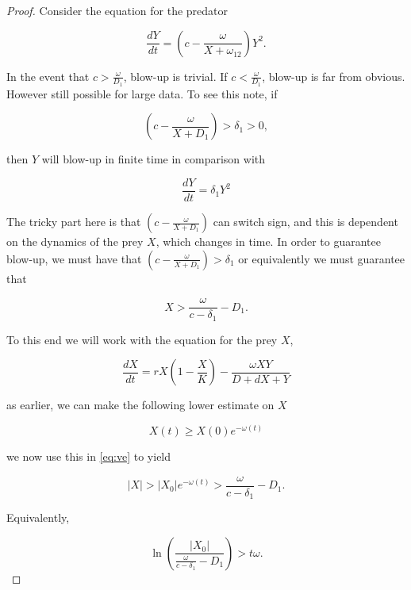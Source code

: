 \documentclass[10pt]{amsart}
\theoremstyle{definition}
\begin{document}
\begin{proof}
Consider the equation for the predator

\begin{equation*}
\frac{dY}{dt}=\left(c-\frac{\omega}{X+\omega_{12}}\right)Y^{2}.
\end{equation*}

In the event that $c> \frac{\omega}{D_{1}}$, blow-up is trivial. If $c < \frac{\omega}{D_{1}}$,  blow-up is far from obvious. However still possible for large data. To see this note, if

\begin{equation*}
\left(c-\frac{\omega}{X+D_{1}}\right) > \delta_{1} > 0,
\end{equation*}

then $Y$ will blow-up in finite time in comparison with

\begin{equation*}
\frac{dY}{dt}=\delta_{1} Y^{2}
\end{equation*}

The tricky part here is that $\left(c-\frac{\omega}{X+D_{1}}\right)$ can switch sign, and this is dependent on the dynamics of the prey $X$, which changes in time.
In order to guarantee blow-up, we must have that $\left(c-\frac{\omega}{X+D_{1}}\right) > \delta_{1} $ or equivalently we must guarantee that

\begin{equation}
\label{eq:ve}
X > \frac{\omega}{c- \delta_{1}} - D_{1}. 
\end{equation}

To this end we will work with the equation for the prey $X$,

\begin{equation*}
\frac{dX}{dt} = rX(1-\frac{X}{K})-\frac{\omega XY}{D+dX+Y}
\end{equation*}

as earlier, we can make the following lower estimate on $X$

\begin{equation*}
X(t) \geq X(0)e^{-\omega(t)}
\end{equation*}

we now use this in \eqref{eq:ve} to yield

\begin{equation*}
|X| >  |X_{0}|e^{-\omega(t)}> \frac{\omega}{c- \delta_{1}} - D_{1}.
\end{equation*}

Equivalently, 

\begin{equation*}
 \ln\left( \frac{|X_{0}|}{\frac{\omega}{c- \delta_{1}} - D_{1}} \right) > t \omega.
\end{equation*}


\end{proof}
\end{document}
